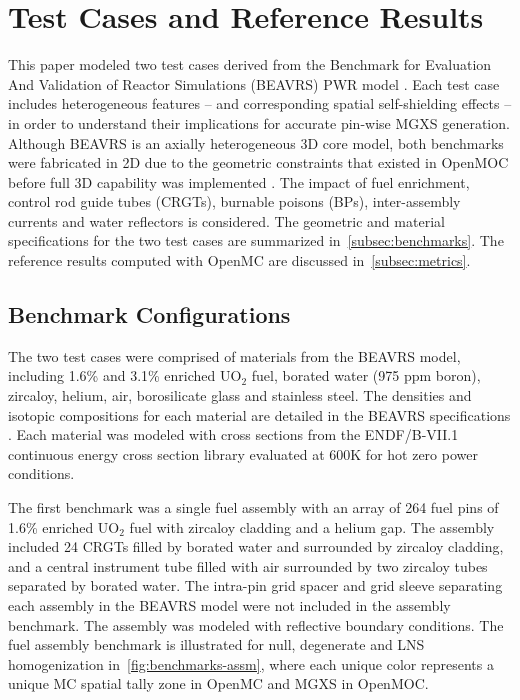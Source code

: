 \section{Test Cases and Reference Results}
\label{sec:test-cases}

This paper modeled two test cases derived from the Benchmark for Evaluation And Validation of Reactor Simulations (BEAVRS) PWR model \citep{horelik2013beavrs}. Each test case includes heterogeneous features -- and corresponding spatial self-shielding effects -- in order to understand their implications for accurate pin-wise MGXS generation. Although BEAVRS is an axially heterogeneous 3D core model, both benchmarks were fabricated in 2D due to the geometric constraints that existed in OpenMOC before full 3D capability was implemented \citep{shaner20163dopenmoc}. The impact of fuel enrichment, control rod guide tubes (CRGTs), burnable poisons (BPs), inter-assembly currents and water reflectors is considered. The geometric and material specifications for the two test cases are summarized in~\autoref{subsec:benchmarks}. The reference results computed with OpenMC are discussed in~\autoref{subsec:metrics}.


\subsection{Benchmark Configurations}
\label{subsec:benchmarks}

The two test cases were comprised of materials from the BEAVRS model, including 1.6\% and 3.1\% enriched UO$_2$ fuel, borated water (975 ppm boron), zircaloy, helium, air, borosilicate glass and stainless steel. The densities and isotopic compositions for each material are detailed in the BEAVRS specifications \citep{horelik2013beavrs}. Each material was modeled with cross sections from the ENDF/B-VII.1 continuous energy cross section library \citep{mcnpx2003manual} evaluated at 600K for hot zero power conditions.

The first benchmark was a single fuel assembly with an array of 264 fuel pins of 1.6\% enriched UO$_2$ fuel with zircaloy cladding and a helium gap. The assembly included 24 CRGTs filled by borated water and surrounded by zircaloy cladding, and a central instrument tube filled with air surrounded by two zircaloy tubes separated by borated water. The intra-pin grid spacer and grid sleeve separating each assembly in the BEAVRS model were not included in the assembly benchmark. The assembly was modeled with reflective boundary conditions. The fuel assembly benchmark is illustrated for null, degenerate and LNS homogenization in~\autoref{fig:benchmarks-assm}, where each unique color represents a unique MC spatial tally zone in OpenMC and MGXS in OpenMOC.

